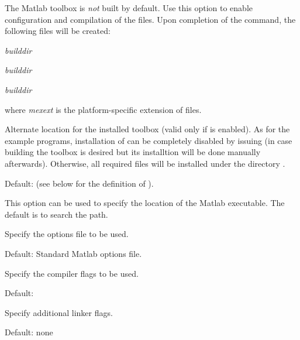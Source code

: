 \begin{config}

\item {}

  The {\sundialsTB} Matlab toolbox is {\em not} built by default. Use this option
  to enable configuration and compilation of the  files. Upon completion
  of the  command, the following  files will be created:
  \begin{config}
    \item {\em builddir}
    \item {\em builddir}
    \item {\em builddir}
  \end{config}
  where {\em mexext} is the platform-specific extension of  files.
  
\item {}

  Alternate location for the installed {\sundialsTB} toolbox (valid only if
  {\sundialsTB} is enabled). As for the example programs, installation of {\sundialsTB} can 
  be completely disabled by issuing  (in case building the toolbox is desired 
  but its installtion will be done manually afterwards). Otherwise, all required {\sundialsTB} 
  files will be installed under the directory .

  Default:   (see below for the definition of ).

\item {}

  This option can be used to specify the location of the Matlab executable. 
  The default is to search the path.

\item {}

  Specify the  options file to be used.

  Default: Standard Matlab  options file.

\item {}

  Specify the  compiler flags to be used.

  Default: 

\item {}

  Specify additional  linker flags.

  Default: none

\end{config}


